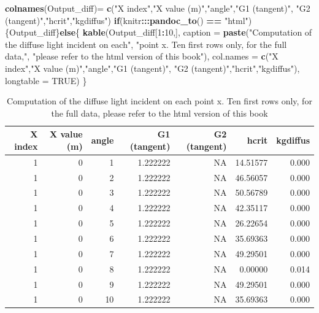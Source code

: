 \documentclass[
]{book}
\newenvironment{Shaded}{\begin{snugshade}}{\end{snugshade}}
\newcommand{\ControlFlowTok}[1]{\textcolor[rgb]{0.13,0.29,0.53}{\textbf{#1}}}
\newcommand{\DataTypeTok}[1]{\textcolor[rgb]{0.13,0.29,0.53}{#1}}
\newcommand{\DecValTok}[1]{\textcolor[rgb]{0.00,0.00,0.81}{#1}}
\newcommand{\KeywordTok}[1]{\textcolor[rgb]{0.13,0.29,0.53}{\textbf{#1}}}
\newcommand{\NormalTok}[1]{#1}
\newcommand{\OperatorTok}[1]{\textcolor[rgb]{0.81,0.36,0.00}{\textbf{#1}}}
\newcommand{\OtherTok}[1]{\textcolor[rgb]{0.56,0.35,0.01}{#1}}
\newcommand{\StringTok}[1]{\textcolor[rgb]{0.31,0.60,0.02}{#1}}
\begin{document}
\begin{Shaded}
\begin{Highlighting}[]
\KeywordTok{colnames}\NormalTok{(Output_diff)=}\StringTok{ }\KeywordTok{c}\NormalTok{(}\StringTok{"X index"}\NormalTok{,}\StringTok{"X value (m)"}\NormalTok{,}\StringTok{"angle"}\NormalTok{,}\StringTok{"G1 (tangent)"}\NormalTok{,}
                         \StringTok{"G2 (tangent)"}\NormalTok{,}\StringTok{"hcrit"}\NormalTok{,}\StringTok{"kgdiffus"}\NormalTok{)}
\ControlFlowTok{if}\NormalTok{(knitr}\OperatorTok{:::}\KeywordTok{pandoc_to}\NormalTok{() }\OperatorTok{==}\StringTok{ "html"}\NormalTok{) \{Output_diff\}}\ControlFlowTok{else}\NormalTok{\{}
  \KeywordTok{kable}\NormalTok{(Output_diff[}\DecValTok{1}\OperatorTok{:}\DecValTok{10}\NormalTok{,],}
        \DataTypeTok{caption =} \KeywordTok{paste}\NormalTok{(}\StringTok{"Computation of the diffuse light incident on each"}\NormalTok{,}
                        \StringTok{"point x. Ten first rows only, for the full data,"}\NormalTok{,}
                        \StringTok{"please refer to the html version of this book"}\NormalTok{),}
        \DataTypeTok{col.names =} \KeywordTok{c}\NormalTok{(}\StringTok{"X index"}\NormalTok{,}\StringTok{"X value (m)"}\NormalTok{,}\StringTok{"angle"}\NormalTok{,}\StringTok{"G1 (tangent)"}\NormalTok{,}
                      \StringTok{"G2 (tangent)"}\NormalTok{,}\StringTok{"hcrit"}\NormalTok{,}\StringTok{"kgdiffus"}\NormalTok{), }\DataTypeTok{longtable =} \OtherTok{TRUE}\NormalTok{)}
\NormalTok{\}}
\end{Highlighting}
\end{Shaded}

\begin{longtable}[t]{r|r|r|r|r|r|r}
\caption{\label{tab:kdiff}Computation of the diffuse light incident on each point x. Ten first rows only, for the full data, please refer to the html version of this book}\\
\hline
X index & X value (m) & angle & G1 (tangent) & G2 (tangent) & hcrit & kgdiffus\\
\hline
1 & 0 & 1 & 1.222222 & NA & 14.51577 & 0.000\\
\hline
1 & 0 & 2 & 1.222222 & NA & 46.56057 & 0.000\\
\hline
1 & 0 & 3 & 1.222222 & NA & 50.56789 & 0.000\\
\hline
1 & 0 & 4 & 1.222222 & NA & 42.35117 & 0.000\\
\hline
1 & 0 & 5 & 1.222222 & NA & 26.22654 & 0.000\\
\hline
1 & 0 & 6 & 1.222222 & NA & 35.69363 & 0.000\\
\hline
1 & 0 & 7 & 1.222222 & NA & 49.29501 & 0.000\\
\hline
1 & 0 & 8 & 1.222222 & NA & 0.00000 & 0.014\\
\hline
1 & 0 & 9 & 1.222222 & NA & 49.29501 & 0.000\\
\hline
1 & 0 & 10 & 1.222222 & NA & 35.69363 & 0.000\\
\hline
\end{longtable}
\end{document}

